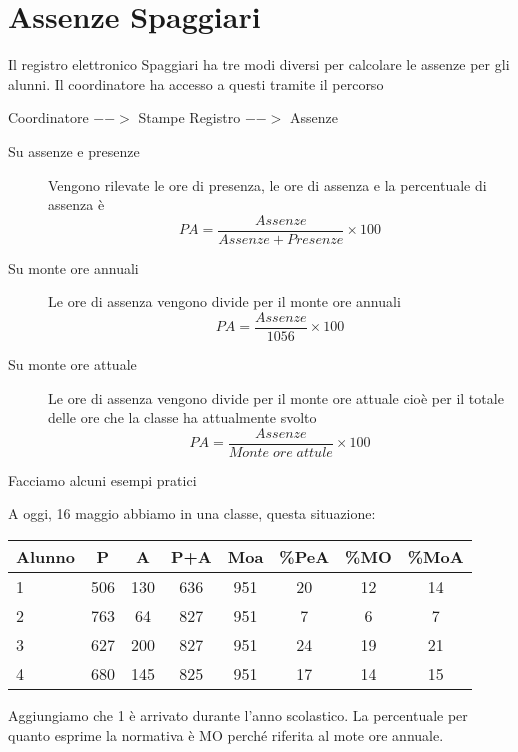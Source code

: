 \documentclass{article}
\begin{document}
\section*{Assenze Spaggiari}
Il registro elettronico Spaggiari  ha tre modi diversi per calcolare le assenze per gli alunni. Il coordinatore ha accesso a questi tramite il percorso

Coordinatore $-->$ Stampe Registro $-->$ Assenze 
\begin{description}
	\item[Su assenze e presenze] Vengono rilevate le ore di presenza, le ore di assenza e la percentuale di assenza è \[PA=\dfrac{Assenze}{Assenze+Presenze}\times 100\]
	\item[Su monte ore annuali] Le ore di assenza vengono divide per il monte ore annuali \[PA=\dfrac{Assenze}{1056}\times 100\]
	\item[Su monte ore attuale] Le ore di assenza vengono divide per il monte ore attuale cioè per il totale delle ore che la classe ha attualmente svolto  \[PA=\dfrac{Assenze}{Monte\; ore\; attule}\times 100\]
\end{description}
Facciamo alcuni esempi pratici

A oggi, 16 maggio abbiamo in una classe, questa situazione:

\begin{center}
	\begin{tabular}{|l|c|c|c|c|c|c|c|}
	\hline
Alunno	& P & A &  P+A &Moa & \%PeA & \%MO & \%MoA   \\
	\hline
1	& 506 & 130& 636 & 951 & 20 & 12 & 14   \\
	\hline
2	&763  &64&827  & 951 &7  & 6 &  7  \\
	\hline
3	&627  &200&827  & 951 &24  & 19 &  21  \\
	\hline
4	&680  &145&825  & 951 &17  & 14 &  15  \\
\hline
\end{tabular} 
\end{center}
Aggiungiamo che 1 è arrivato durante l'anno scolastico. La percentuale per quanto esprime la normativa è MO perché riferita al mote ore annuale.
\end{document}
